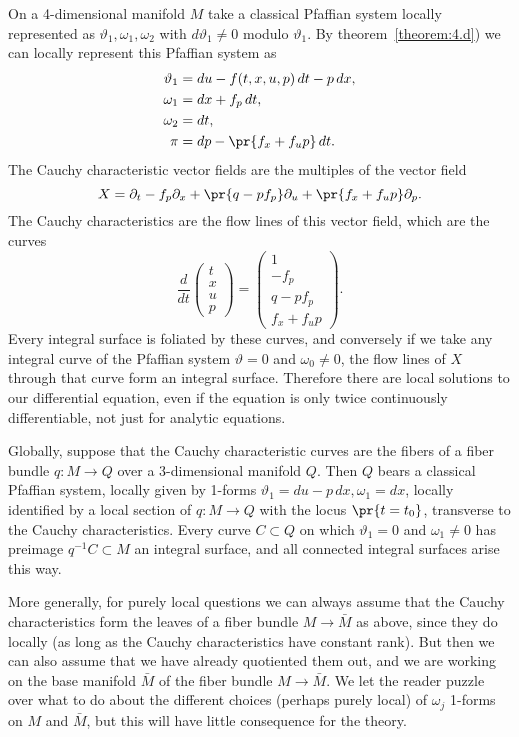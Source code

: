 \begin{example} 
On a 4-dimensional manifold \(M\) take a classical Pfaffian system locally represented as \(\vartheta_1, \omega_1, \omega_2\) with \(d \vartheta_1 \ne 0\) modulo \(\vartheta_1\).
By theorem~\vref{theorem:4.d}) we can locally represent this Pfaffian system as
\begin{align*}
\vartheta_1&=du-f(t,x,u,p) \, dt - p \, dx, \\
\omega_1&= dx+f_p \, dt, \\
\omega_2&= dt, \\
\pi&=dp-\pr{f_x + f_u p} \, dt.
\end{align*}
The Cauchy characteristic vector fields are the multiples of the vector field
\[
X=\partial_t-f_p \partial_x + \pr{q-pf_p} \partial_u + \pr{f_x+f_up} \partial_p.
\]
The Cauchy characteristics are the flow lines of this vector field, which are the curves
\[
\frac{d}{dt}
\begin{pmatrix}
t \\
x \\
u \\
p
\end{pmatrix}
=
\begin{pmatrix}
1 \\
-f_p \\
q-pf_p \\
f_x + f_u p
\end{pmatrix}.
\]
Every integral surface is foliated by these curves, and conversely if we take any integral curve of the Pfaffian system \(\vartheta=0\) and \(\omega_0 \ne 0\), the flow lines of \(X\) through that curve form an integral surface.
Therefore there are local solutions to our differential equation, even if the equation is only twice continuously differentiable, not just for analytic equations.

Globally, suppose that the Cauchy characteristic curves are the fibers of a fiber bundle \(q \colon M \to Q\) over a 3-dimensional manifold \(Q\).
Then \(Q\) bears a classical Pfaffian system, locally given by 1-forms \(\vartheta_1 = du-p \, dx, \omega_1=dx\), locally identified by a local section of \(q \colon M \to Q\) with the locus \(\pr{t=t_0}\), transverse to the Cauchy characteristics.
Every curve \(C \subset Q\) on which \(\vartheta_1=0\) and \(\omega_1 \ne 0\) has preimage \(q^{-1} C \subset M\) an integral surface, and all connected integral surfaces arise this way.
\end{example}

More generally, for purely local questions we can always assume that the Cauchy characteristics form the leaves of a fiber bundle \(M \to \bar{M}\) as above, since they do locally (as long as the Cauchy characteristics have constant rank).
But then we can also assume that we have already quotiented them out, and we are working on the base manifold \(\bar{M}\) of the fiber bundle \(M \to \bar{M}\).
We let the reader puzzle over what to do about the different choices (perhaps purely local) of \(\omega_j\) 1-forms on \(M\) and \(\bar{M}\), but this will have little consequence for the theory.